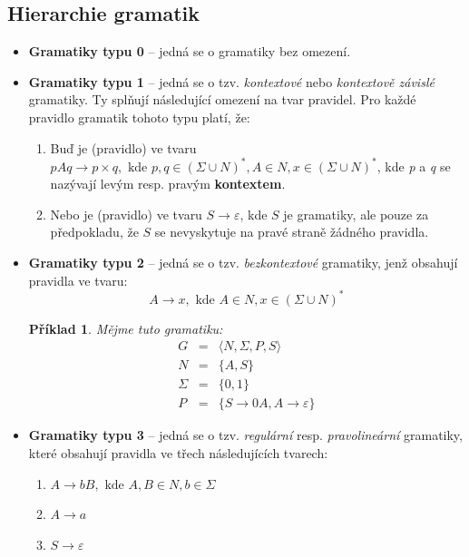 \documentclass[10pt, a4paper, titlepage]{article}
\theoremstyle{note}
\newtheorem{priklad}{\textbf{Příklad}}
\begin{document}
\subsection{Hierarchie gramatik}
\begin{itemize}
\item
\textbf{Gramatiky typu 0} -- jedná se o gramatiky bez omezení.

\item
\textbf{Gramatiky typu 1\label{gram-1}} -- jedná se o tzv. \emph{kontextové} nebo \emph{kontextově závislé} gramatiky.
Ty splňují následující omezení na tvar pravidel. Pro každé pravidlo gramatik tohoto typu platí, že:
\begin{enumerate}
\item
Buď je (pravidlo) ve tvaru $pAq \rightarrow p \times q, \text{ kde } p, q \in (\Sigma \cup N)^{*}, A \in N, x \in (\Sigma \cup N)^{*}$, kde \emph{p} a \emph{q}
se nazývají levým resp. pravým \textbf{kontextem}.

\item
Nebo je (pravidlo) ve tvaru $S \rightarrow \varepsilon$, kde $S$ je  gramatiky, ale pouze
za předpokladu, že $S$ se nevyskytuje na pravé straně žádného pravidla.
\end{enumerate}

\item
\textbf{Gramatiky typu 2} -- jedná se o tzv. \emph{bezkontextové} gramatiky, jenž obsahují pravidla ve tvaru:
$$
A \rightarrow x, \text{ kde } A \in N, x \in (\Sigma \cup N)^{*}
$$

\begin{priklad}
Mějme tuto gramatiku:
\begin{eqnarray*}
G &=& \langle N, \Sigma, P, S \rangle \\
N &=& \lbrace A, S \rbrace \\
\Sigma &=& \lbrace 0, 1 \rbrace \\
P &=& \lbrace S \rightarrow 0A, A \rightarrow \varepsilon \rbrace
\end{eqnarray*}
\end{priklad}

\item
\textbf{Gramatiky typu 3\label{gram-3}} -- jedná se o tzv. \emph{regulární} resp. \emph{pravolineární} gramatiky, které obsahují pravidla ve třech následujících tvarech:

\begin{enumerate}
\item
$A \rightarrow bB, \text{ kde } A,B \in N, b \in \Sigma$

\item
$A \rightarrow a$

\item
$S \rightarrow \varepsilon$
\end{enumerate}

\end{itemize}
\end{document}
